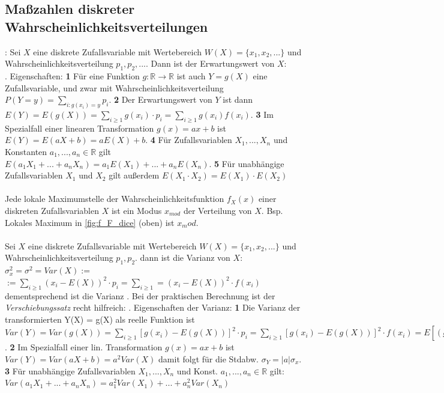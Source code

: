 \subsection{Maßzahlen diskreter Wahrscheinlichkeitsverteilungen}
: Sei $X$ eine diskrete Zufallsvariable mit Wertebereich $W(X) = \{x_1, x_2, ...\}$ und Wahrscheinlichkeitsverteilung $p_1, p_2, ...$. Dann ist der Erwartungswert von $X$:\\ . Eigenschaften: \textbf{1} Für eine Funktion $g: \mathds{R} \rightarrow \mathds{R}$ ist auch $Y = g(X)$ eine Zufallsvariable, und zwar mit Wahrscheinlichkeitsverteilung $P(Y = y) = \sum_{i: g(x_i) = y} p_i$. \textbf{2} Der Erwartungswert von $Y$ ist dann $E(Y) = E(g(X)) = \sum_{i\ge1} g(x_i) \cdot p_i = \sum_{i\ge1} g(x_i) f(x_i)$. \textbf{3} Im Spezialfall einer linearen Transformation $g(x) = ax + b$ ist $E(Y) = E(aX+b) = aE(X) + b$. \textbf{4} Für Zufallsvariablen $X_1, ..., X_n$ und Konstanten $a_1, ..., a_n \in \mathds{R}$ gilt $E(a_1X_1 + ... + a_nX_n) = a_1E(X_1) + ... + a_nE(X_n)$. \textbf{5} Für unabhängige Zufallsvariablen $X_1$ und $X_2$ gilt außerdem $E(X_1 \cdot X_2) = E(X_1) \cdot E(X_2)$\\\\
 Jede lokale Maximumstelle der Wahrscheinlichkeitsfunktion $f_X(x)$ einer diskreten Zufallsvariablen $X$ ist ein Modus $x_{mod}$ der Verteilung von $X$. Bsp. Lokales Maximum in \cref{fig:f_F_dice} (oben) ist $x_mod$.\\\\
 Sei $X$ eine diskrete Zufallsvariable mit Wertebereich $W(X) = \{x_1, x_2, ...\}$ und Wahrscheinlichkeitsverteilung $p_1, p_2$. dann ist die Varianz von $X$: $\sigma_x^2 = \sigma^2 = Var(X):= $ $ :=\sum_{i\ge1} (x_i - E(X))^2 \cdot p_i = \sum_{i\ge1} = (x_i - E(X))^2 \cdot f(x_i)$ dementsprechend ist die Varianz . Bei der praktischen Berechnung ist der \emph{Verschiebungssatz} recht hilfreich: . Eigenschaften der Varianz: \textbf{1} Die Varianz der transformierten Y(X) = g(X) als reelle Funktion ist $Var(Y) = Var(g(X)) = \sum_{i\ge1} [g(x_i) - E(g(X))]^2 \cdot p_i = \sum_{i\ge1} [g(x_i) - E(g(X))]^2 \cdot f(x_i) = E[(g(X) - E(g(X)))^2] = E(g(X)^2) - E^2(g(X))$. \textbf{2} Im Spezialfall einer lin. Transformation $g(x) = ax + b$  ist $Var(Y) = Var(aX + b) = a^2Var(X)$ damit folgt für die Stdabw. $\sigma_Y = |a|\sigma_x$. \textbf{3} Für unabhängige Zufallsvariablen $X_1, ..., X_n$ und Konst. $a_1, ..., a_n \in \mathds{R}$ gilt: $Var(a_1X_1 + ... + a_nX_n) = a_1^2Var(X_1) + ... + a_n^2Var(X_n)$ 
\newpage

